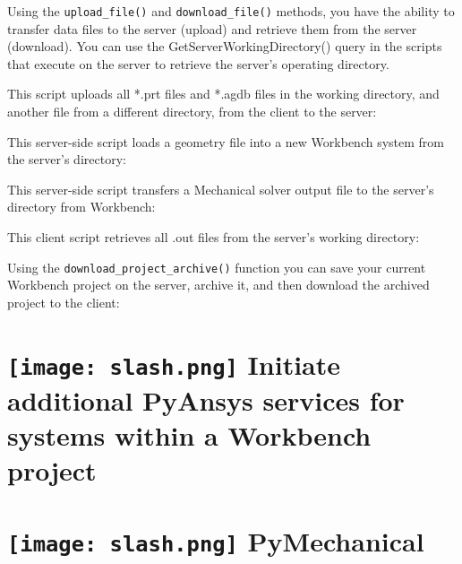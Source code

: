\documentclass[9pt,landscape]{article}
\begin{document}
\begin{multicols}{3}
Using the \texttt{upload_file()} and \texttt{download_file()} methods, you have the ability to transfer data files to the server (upload) and retrieve them from the server (download).
You can use the GetServerWorkingDirectory() query in the scripts that execute on the server to retrieve the server's operating directory.

This script uploads all *.prt files and *.agdb files in the working directory, and another file from a different directory, from the client to the server:

\vspace{2mm} %

This server-side script loads a geometry file into a new Workbench system from the server's directory:


This server-side script transfers a Mechanical solver output file to the server's directory from Workbench:


This client script retrieves all .out files from the server's working directory:


Using the \texttt{download_project_archive()} function you can save your current Workbench project on the server, archive it, and then download the archived project to the client:




\section{\texttt{[image: slash.png]} Initiate additional PyAnsys services for systems within a Workbench project}

\section{\texttt{[image: slash.png]} PyMechanical}


\end{multicols}
\end{document}
